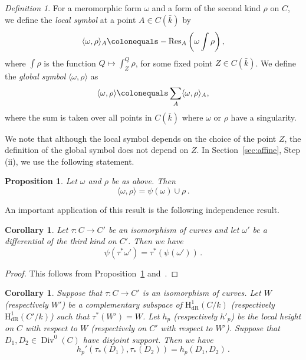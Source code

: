 \documentclass[11pt, a4paper]{amsart}
\newcommand{\hdr}{\operatorname{H^1_{dR}}}
\newcommand{\Div}{\operatorname{Div}}
\newcommand{\Res}{\operatorname{Res}}
\newtheorem{proposition}[theorem]{Proposition}
\newtheorem{corollary}[theorem]{Corollary}
\theoremstyle{remark}
\newtheorem{definition}[theorem]{Definition}
\numberwithin{equation}{section}
\newcommand{\sg}{{}}
\newcommand{\sm}{{}}
\begin{document}
\begin{definition}
For a meromorphic form $\omega$ and a form of the second kind $\rho$ on
  $C$, we define the \textit{local symbol} at a point $A\in C(\bar{k})$ by
$$\langle \omega,\rho\rangle _A\colonequals -\Res_A\left(\omega\int\rho\right),$$
where $\int\rho$ is the function $Q\mapsto\int_{Z}^{Q}\rho$, for some fixed
  point $Z\in C(\bar{k})$.
We define the \textit{global symbol} $\langle \omega,\rho\rangle $ as
$$\langle \omega,\rho\rangle \colonequals \sum_{A}\langle \omega,\rho\rangle _A,$$
where the sum is taken over all points in $C(\bar{k})$ where $\omega$ or $\rho$ have a singularity.
\end{definition} 
We note that although the local symbol depends on
the choice of the point $Z$, the definition of the global symbol does not depend on $Z$. 
In Section~\ref{sec:affine}, Step
(ii), we use the following statement. 
\begin{proposition}{\cite[Proposition 4.10]{Besser-Syntomic-2}}\label{prop:Cup-of-psi}
Let $\omega$ and $\rho$ be as above. Then
  $$\langle \omega,\rho\rangle =\psi(\omega)\cup\sm{ \rho}\,.$$ 
\end{proposition} 
An important application of this result is the following independence result.
\begin{corollary}\label{cor:psi-commutes-with-isomoprhisms}
  Let $\tau\colon C\to C'$ be an isomorphism of curves and let $\omega'$ be a
 differential of the third kind on $C'$. Then we have
  $$\psi(\tau^{*}\omega')=\tau^{*}(\psi(\omega'))\,.$$
\end{corollary}
\begin{proof}
  This follows from Proposition~\ref{prop:Cup-of-psi}
  and~\cite[Lemma~3.8]{Besser-padic-Arakelov}.
\end{proof}

\begin{corollary}\label{cor:height-independence}
  Suppose that $\tau\colon C\to C'$ is an isomorphism of curves. Let $W$
  (respectively $W'$) be a complementary subspace of $\hdr(C/k)$
  (respectively $\hdr(C'/k)$) such that \sm{$\tau^*(W') = W$}.
  Let $h_p$ (respectively $h'_p$) be the local height on $C$ with respect to $W$
  (respectively on $C'$ with respect to $W'$). Suppose that $D_1,D_2\in \Div^0(C)$ have disjoint support. Then we have
$$
h_p'(\tau_*(D_1), \tau_*(D_2)) = h_p(D_1,D_2)\,.
$$
\end{corollary}
\end{document}
